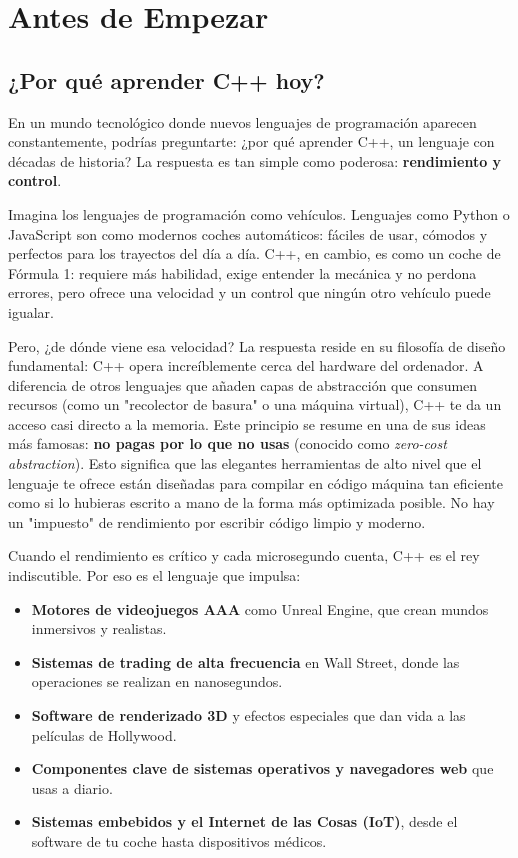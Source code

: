 \section{Antes de Empezar}
\label{sec:antes_de_empezar}


\subsection{¿Por qué aprender C++ hoy?}
\label{sec:motivacion}

En un mundo tecnológico donde nuevos lenguajes de programación aparecen constantemente, podrías preguntarte: ¿por qué aprender C++, un lenguaje con décadas de historia? La respuesta es tan simple como poderosa: \textbf{rendimiento y control}.

Imagina los lenguajes de programación como vehículos. Lenguajes como Python o JavaScript son como modernos coches automáticos: fáciles de usar, cómodos y perfectos para los trayectos del día a día. C++, en cambio, es como un coche de Fórmula 1: requiere más habilidad, exige entender la mecánica y no perdona errores, pero ofrece una velocidad y un control que ningún otro vehículo puede igualar.

Pero, ¿de dónde viene esa velocidad? La respuesta reside en su filosofía de diseño fundamental: C++ opera increíblemente cerca del hardware del ordenador. A diferencia de otros lenguajes que añaden capas de abstracción que consumen recursos (como un "recolector de basura" o una máquina virtual), C++ te da un acceso casi directo a la memoria. Este principio se resume en una de sus ideas más famosas: \textbf{no pagas por lo que no usas} (conocido como \textit{zero-cost abstraction}). Esto significa que las elegantes herramientas de alto nivel que el lenguaje te ofrece están diseñadas para compilar en código máquina tan eficiente como si lo hubieras escrito a mano de la forma más optimizada posible. No hay un "impuesto" de rendimiento por escribir código limpio y moderno.

Cuando el rendimiento es crítico y cada microsegundo cuenta, C++ es el rey indiscutible. Por eso es el lenguaje que impulsa:
\begin{itemize}
    \item \textbf{Motores de videojuegos AAA} como Unreal Engine, que crean mundos inmersivos y realistas.
    \item \textbf{Sistemas de trading de alta frecuencia} en Wall Street, donde las operaciones se realizan en nanosegundos.
    \item \textbf{Software de renderizado 3D} y efectos especiales que dan vida a las películas de Hollywood.
    \item \textbf{Componentes clave de sistemas operativos y navegadores web} que usas a diario.
    \item \textbf{Sistemas embebidos y el Internet de las Cosas (IoT)}, desde el software de tu coche hasta dispositivos médicos.
\end{itemize}

